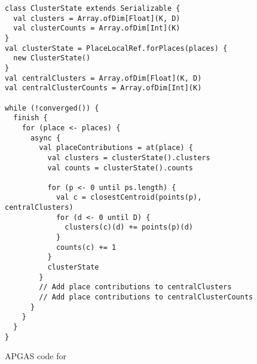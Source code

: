 \begin{figure}[tbp]
  \begin{lstlisting}
class ClusterState extends Serializable {
  val clusters = Array.ofDim[Float](K, D)
  val clusterCounts = Array.ofDim[Int](K)
}
val clusterState = PlaceLocalRef.forPlaces(places) {
  new ClusterState()
}
val centralClusters = Array.ofDim[Float](K, D)
val centralClusterCounts = Array.ofDim[Int](K)

while (!converged()) {
  finish {
    for (place <- places) {
      async {
        val placeContributions = at(place) {
          val clusters = clusterState().clusters
          val counts = clusterState().counts

          for (p <- 0 until ps.length) {
            val c = closestCentroid(points(p), centralClusters)
            for (d <- 0 until D) {
              clusters(c)(d) += points(p)(d)
            }
            counts(c) += 1
          }
          clusterState
        }
        // Add place contributions to centralClusters
        // Add place contributions to centralClusterCounts
      }
    }
  }
}  

  \end{lstlisting}
  \caption{APGAS code for \kmeans}
  \label{fig:kmeansCode}
\end{figure}

% 
% 
% 
